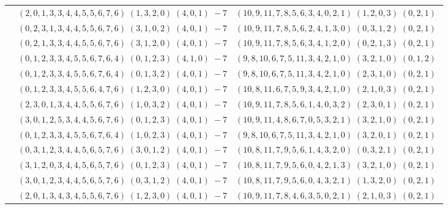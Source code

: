 \documentclass[11pt]{article}
\begin{document}
\begin{longtable}[l]{|c|c|c|}
 \cline{2-3} 
 & $(2 ,0 ,1 ,3 ,3 ,4 ,4 ,5 ,5 ,6 ,7 ,6) \;(1 ,3 ,2 ,0) \;(4 ,0 ,1) \;-7$ & $(10 ,9 ,11 ,7 ,8 ,5 ,6 ,3 ,4 ,0 ,2 ,1) \;(1 ,2 ,0 ,3) \;(0 ,2 ,1) \;$\\ 
 \cline{2-3} 
 & $(0 ,2 ,3 ,1 ,3 ,4 ,4 ,5 ,5 ,6 ,7 ,6) \;(3 ,1 ,0 ,2) \;(4 ,0 ,1) \;-7$ & $(10 ,9 ,11 ,7 ,8 ,5 ,6 ,2 ,4 ,1 ,3 ,0) \;(0 ,3 ,1 ,2) \;(0 ,2 ,1) \;$\\ 
 \cline{2-3} 
 & $(0 ,2 ,1 ,3 ,3 ,4 ,4 ,5 ,5 ,6 ,7 ,6) \;(3 ,1 ,2 ,0) \;(4 ,0 ,1) \;-7$ & $(10 ,9 ,11 ,7 ,8 ,5 ,6 ,3 ,4 ,1 ,2 ,0) \;(0 ,2 ,1 ,3) \;(0 ,2 ,1) \;$\\ 
 \cline{2-3} 
 & $(0 ,1 ,2 ,3 ,3 ,4 ,5 ,5 ,6 ,7 ,6 ,4) \;(0 ,1 ,2 ,3) \;(4 ,1 ,0) \;-7$ & $(9 ,8 ,10 ,6 ,7 ,5 ,11 ,3 ,4 ,2 ,1 ,0) \;(3 ,2 ,1 ,0) \;(0 ,1 ,2) \;$\\ 
 \cline{2-3} 
 & $(0 ,1 ,2 ,3 ,3 ,4 ,5 ,5 ,6 ,7 ,6 ,4) \;(0 ,1 ,3 ,2) \;(4 ,0 ,1) \;-7$ & $(9 ,8 ,10 ,6 ,7 ,5 ,11 ,3 ,4 ,2 ,1 ,0) \;(2 ,3 ,1 ,0) \;(0 ,2 ,1) \;$\\ 
 \cline{2-3} 
 & $(0 ,1 ,2 ,3 ,3 ,4 ,5 ,5 ,6 ,4 ,7 ,6) \;(1 ,2 ,3 ,0) \;(4 ,0 ,1) \;-7$ & $(10 ,8 ,11 ,6 ,7 ,5 ,9 ,3 ,4 ,2 ,1 ,0) \;(2 ,1 ,0 ,3) \;(0 ,2 ,1) \;$\\ 
 \cline{2-3} 
 & $(2 ,3 ,0 ,1 ,3 ,4 ,4 ,5 ,5 ,6 ,7 ,6) \;(1 ,0 ,3 ,2) \;(4 ,0 ,1) \;-7$ & $(10 ,9 ,11 ,7 ,8 ,5 ,6 ,1 ,4 ,0 ,3 ,2) \;(2 ,3 ,0 ,1) \;(0 ,2 ,1) \;$\\ 
 \cline{2-3} 
 & $(3 ,0 ,1 ,2 ,5 ,3 ,4 ,4 ,5 ,6 ,7 ,6) \;(0 ,1 ,2 ,3) \;(4 ,0 ,1) \;-7$ & $(10 ,9 ,11 ,4 ,8 ,6 ,7 ,0 ,5 ,3 ,2 ,1) \;(3 ,2 ,1 ,0) \;(0 ,2 ,1) \;$\\ 
 \cline{2-3} 
 & $(0 ,1 ,2 ,3 ,3 ,4 ,5 ,5 ,6 ,7 ,6 ,4) \;(1 ,0 ,2 ,3) \;(4 ,0 ,1) \;-7$ & $(9 ,8 ,10 ,6 ,7 ,5 ,11 ,3 ,4 ,2 ,1 ,0) \;(3 ,2 ,0 ,1) \;(0 ,2 ,1) \;$\\ 
 \cline{2-3} 
 & $(0 ,3 ,1 ,2 ,3 ,4 ,4 ,5 ,6 ,5 ,7 ,6) \;(3 ,0 ,1 ,2) \;(4 ,0 ,1) \;-7$ & $(10 ,8 ,11 ,7 ,9 ,5 ,6 ,1 ,4 ,3 ,2 ,0) \;(0 ,3 ,2 ,1) \;(0 ,2 ,1) \;$\\ 
 \cline{2-3} 
 & $(3 ,1 ,2 ,0 ,3 ,4 ,4 ,5 ,6 ,5 ,7 ,6) \;(0 ,1 ,2 ,3) \;(4 ,0 ,1) \;-7$ & $(10 ,8 ,11 ,7 ,9 ,5 ,6 ,0 ,4 ,2 ,1 ,3) \;(3 ,2 ,1 ,0) \;(0 ,2 ,1) \;$\\ 
 \cline{2-3} 
 & $(3 ,0 ,1 ,2 ,3 ,4 ,4 ,5 ,6 ,5 ,7 ,6) \;(0 ,3 ,1 ,2) \;(4 ,0 ,1) \;-7$ & $(10 ,8 ,11 ,7 ,9 ,5 ,6 ,0 ,4 ,3 ,2 ,1) \;(1 ,3 ,2 ,0) \;(0 ,2 ,1) \;$\\ 
 \cline{2-3} 
 & $(2 ,0 ,1 ,3 ,4 ,3 ,4 ,5 ,5 ,6 ,7 ,6) \;(1 ,2 ,3 ,0) \;(4 ,0 ,1) \;-7$ & $(10 ,9 ,11 ,7 ,8 ,4 ,6 ,3 ,5 ,0 ,2 ,1) \;(2 ,1 ,0 ,3) \;(0 ,2 ,1) \;$\\ 

\end{longtable}
\end{document}
